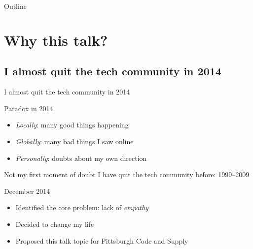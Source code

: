 \begin{frame}{Outline}
  \tableofcontents[subsectionstyle=hide]
\end{frame}

\section{Why this talk?}

\subsection{I almost quit the tech community in 2014}

\begin{frame}{I almost quit the tech community in 2014}
  \begin{block}{Paradox in 2014}
    \begin{itemize}
    \item \emph{Locally}: many good things happening
    \item \emph{Globally}: many bad things I saw online
    \item \emph{Personally}: doubts about my own direction
    \end{itemize}
  \end{block}

  \begin{alertblock}{Not my first moment of doubt}
    I have quit the tech community before: 1999--2009
  \end{alertblock}

  \begin{block}{December 2014}
    \begin{itemize}
    \item Identified the core problem: lack of \emph{empathy}
    \item Decided to change my life
    \item Proposed this talk topic for Pittsburgh Code and Supply
    \end{itemize}
  \end{block}
\end{frame}

